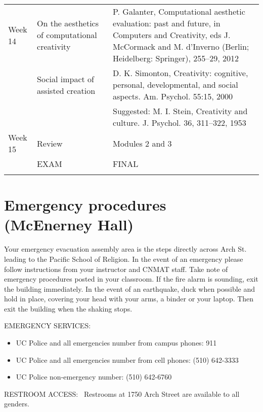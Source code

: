 \documentclass[letterpaper]{inzane_syllabus} %
\begin{document}
\begin{center}
\begin{tabularx}{\textwidth}{p{2cm}p{8cm} @{\hskip 0.5cm} p{9.5cm}}
Week 14 & On the aesthetics of computational creativity & P. Galanter, Computational aesthetic evaluation: past and future, in Computers and Creativity, eds J. McCormack and M. d’Inverno (Berlin; Heidelberg: Springer), 255–29, 2012  \\

& Social impact of assisted creation & D. K. Simonton, Creativity: cognitive, personal, developmental, and social aspects. Am. Psychol. 55:15, 2000 \\
& & Suggested: M. I. Stein, Creativity and culture. J. Psychol. 36, 311–322, 1953 \\
\arrayrulecolor{maingray}\hline

Week 15 & Review & Modules 2 and 3\\

& EXAM & FINAL \\
\arrayrulecolor{myCOLOR}\hline
\hline 
\hline 
\hline 
\end{tabularx}
\end{center}




\vspace{0.5cm}
\section{Emergency procedures (McEnerney Hall)}

Your emergency evacuation assembly area is the steps directly across Arch St. leading to the Pacific School of Religion.
In the event of an emergency please follow instructions from your instructor and CNMAT staff.
Take note of emergency procedures posted in your classroom. If the fire alarm is sounding, exit the building immediately. In the event of an earthquake, duck when possible and hold in place, covering your head with your arms, a binder or your laptop. Then exit the building when the shaking stops.

EMERGENCY SERVICES:
\begin{itemize}
\item UC Police and all emergencies number from campus phones: 911
\item UC Police and all emergencies number from cell phones: (510) 642-3333
\item UC Police non-emergency number: (510) 642-6760
\end{itemize}
RESTROOM ACCESS: 
Restrooms at 1750 Arch Street are available to all genders.
\end{document}
